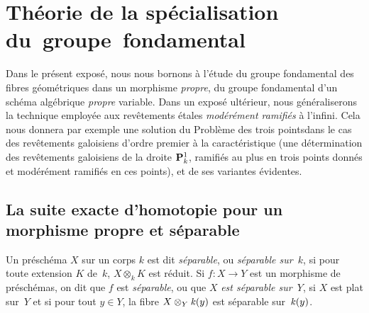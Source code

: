 \chapter{Th\'eorie de la sp\'ecialisation du~groupe~fondamental}
\label{X}
Dans le pr\'esent expos\'e, nous nous bornons \`a l'\'etude du
groupe fondamental des fibres g\'eom\'etriques dans un morphisme
\emph{propre}, \ie du groupe fondamental d'un sch\'ema
alg\'ebrique \emph{propre} variable. Dans un expos\'e
ult\'erieur, nous g\'en\'eraliserons la technique employ\'ee
aux rev\^etements \'etales \emph{modérément ramifiés}
\og \`a l'infini\fg. Cela nous donnera par exemple une solution du
\og Probl\`eme des trois points\fg dans le cas des rev\^etements
galoisiens d'ordre premier \`a la caract\'eristique (\ie une
d\'etermination des rev\^etements galoisiens de la droite
$\mathbf{P}_k^1$, ramifi\'es au plus en trois points donn\'es et
mod\'er\'ement ramifi\'es en ces points), et de ses variantes
\'evidentes.

\section[La suite exacte d'homotopie pour un morphisme propre]
{La suite exacte d'homotopie pour un morphisme propre et s\'eparable}
\label{X.1}

\begin{definition}
\label{X.1.1}
Un pr\'esch\'ema $X$ sur un corps $k$ est dit
\emph{séparable}, ou \emph{séparable sur~$k$}, si pour toute
extension $K$ de~$k$, $X\otimes_k K$ est r\'eduit. Si $f\colon X\to
Y$ est un morphisme de pr\'esch\'emas, on dit que $f$ est
\emph{séparable}, ou que $X$ \emph{est séparable sur~$Y$}, si
$X$ est plat sur~$Y$ et si pour tout $y\in Y$, la fibre $X\otimes_Y
\mathit{k}(y)$ est s\'eparable sur~$\mathit{k}(y)$.
\end{definition}

